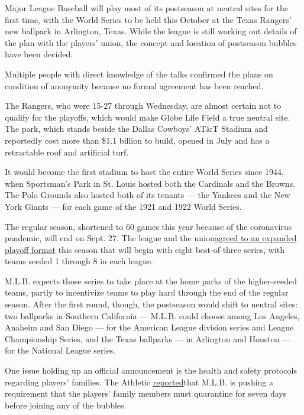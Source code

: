 Major League Baseball will play most of its postseason at neutral sites
for the first time, with the World Series to be held this October at the
Texas Rangers' new ballpark in Arlington, Texas. While the league is
still working out details of the plan with the players' union, the
concept and location of postseason bubbles have been decided.

Multiple people with direct knowledge of the talks confirmed the plans
on condition of anonymity because no formal agreement has been reached.

The Rangers, who were 15-27 through Wednesday, are almost certain not to
qualify for the playoffs, which would make Globe Life Field a true
neutral site. The park, which stands beside the Dallas Cowboys' AT\&T
Stadium and reportedly cost more than \$1.1 billion to build, opened in
July and has a retractable roof and artificial turf.

It would become the first stadium to host the entire World Series since
1944, when Sportsman's Park in St. Louis hosted both the Cardinals and
the Browns. The Polo Grounds also hosted both of its tenants --- the
Yankees and the New York Giants --- for each game of the 1921 and 1922
World Series.

The regular season, shortened to 60 games this year because of the
coronavirus pandemic, will end on Sept. 27. The league and the
union\href{https://www.nytimes3xbfgragh.onion/2020/07/23/sports/baseball/mlb-playoffs.html}{agreed
to an expanded playoff format} this season that will begin with eight
best-of-three series, with teams seeded 1 through 8 in each league.

M.L.B. expects those series to take place at the home parks of the
higher-seeded teams, partly to incentivize teams to play hard through
the end of the regular season. After the first round, though, the
postseason would shift to neutral sites: two ballparks in Southern
California --- M.L.B. could choose among Los Angeles, Anaheim and San
Diego --- for the American League division series and League
Championship Series, and the Texas ballparks --- in Arlington and
Houston --- for the National League series.

One issue holding up an official announcement is the health and safety
protocols regarding players' families. The Athletic
\href{https://theathletic.com/2055982/2020/09/09/rosenthal-dodgers-push-back-on-proposed-family-restrictions-for-the-postseason/}{reported}that
M.L.B. is pushing a requirement that the players' family members must
quarantine for seven days before joining any of the bubbles.

